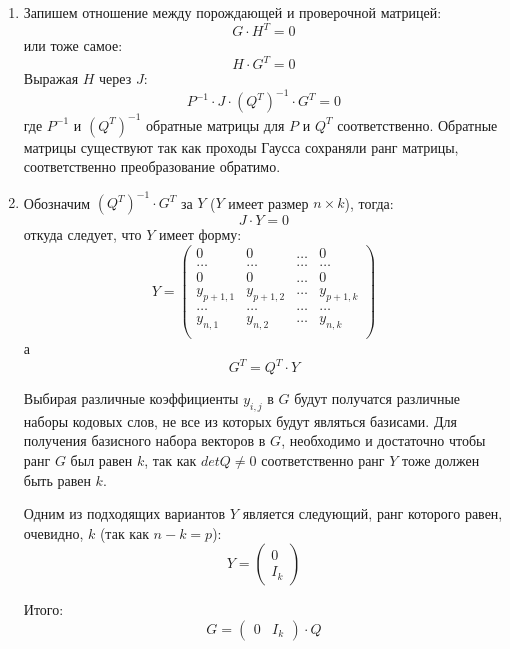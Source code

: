 \begin{enumerate}
 	\item Запишем отношение между порождающей и проверочной матрицей:
 	 \[
 	 	G \cdot H^T = 0
 	 \]
 	 или тоже самое:
 	 \[
 	 	H \cdot G^T = 0
 	 \]
 	 Выражая $H$ через $J$:
 	 \[
 	 	P^{-1} \cdot J \cdot (Q^T)^{-1} \cdot G^T = 0
 	 \]
 	 где $P^{-1}$ и $(Q^T)^{-1}$ обратные матрицы для $P$ и $Q^T$ соответственно. Обратные матрицы существуют
 	 так как проходы Гаусса сохраняли ранг матрицы, соответственно преобразование обратимо.
 	 
 	 \item Обозначим $(Q^T)^{-1} \cdot G^T$ за $Y$ ($Y$ имеет размер $n\times k$), тогда:
 	\[
 		J \cdot Y = 0
 	\]
 	откуда следует, что $Y$ имеет форму:
 	\[
 		Y=\begin{pmatrix}
 			0 & 0 & \ldots & 0 \\
 			\ldots & \ldots & \ldots & \ldots \\
 			0 & 0 & \ldots & 0 \\
 			y_{p+1,1} & y_{p+1,2} & \ldots & y_{p+1,k} \\
 			\ldots & \ldots & \ldots & \ldots \\
 			y_{n,1} & y_{n,2} & \ldots & y_{n,k} \\
 		\end{pmatrix}
 	\]
 	а
 	\[
 	G^T = Q^T \cdot Y
 	\]
 	
 	Выбирая различные коэффициенты $y_{i,j}$ в $G$ будут получатся различные наборы кодовых слов,
 	не все из которых будут являться базисами. Для получения базисного набора векторов в $G$, необходимо
 	и достаточно чтобы ранг $G$ был равен $k$, так как $det Q \neq 0$ соответственно
 	 ранг $Y$ тоже должен быть равен $k$.
 	
 	Одним из подходящих вариантов $Y$ является следующий, ранг которого равен, 
 	очевидно, $k$ (так как $n - k = p$):
 	\[
 		Y=\begin{pmatrix}
 			0 \\
 			I_k
 		\end{pmatrix}
 	\]
 	
 	Итого:
 	\[
 	G=\begin{pmatrix}
 		0 & I_k
 	\end{pmatrix} \cdot Q
 	\] 
 \end{enumerate}












